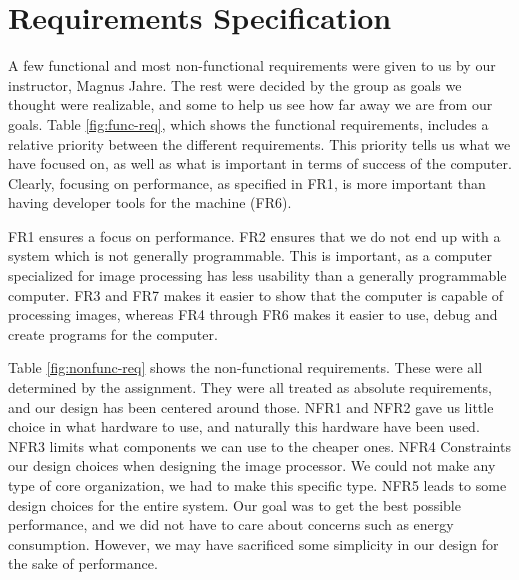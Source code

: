 \section{Requirements Specification}

 A few functional
and most non-functional requirements were given to us by our instructor, Magnus
Jahre. The rest were decided by the group as goals we thought were realizable, and
some to help us see how far away we are from our goals. Table
\ref{fig:func-req}, which shows the functional requirements, includes a relative
priority between the different requirements.  This priority tells us what we
have focused on, as well as what is important in terms of success of the
computer. Clearly, focusing on performance, as specified in {\sc FR1}, is more
important than having developer tools for the machine ({\sc FR6}).

{\sc FR1} ensures a focus on performance. {\sc FR2} ensures that we do not end
up with a system which is not generally programmable. This is important, as a
computer specialized for image processing has less usability than a generally
programmable computer. {\sc FR3} and {\sc FR7} makes it easier to show that the
computer is capable of processing images, whereas {\sc FR4} through {\sc FR6} makes it
easier to use, debug and create programs for the computer.



Table \ref{fig:nonfunc-req} shows the non-functional requirements. These were
all determined by the assignment. They were all treated as absolute requirements,
and our design has been centered around those. {\sc NFR1} and {\sc NFR2} gave us
little choice in what hardware to use, and naturally this hardware have been used. {\sc
  NFR3} limits what components we can use to the cheaper ones. {\sc NFR4} Constraints our
design choices when designing the image processor. We could not make any type of core
organization, we had to make this specific type. {\sc NFR5} leads to some
design choices for the entire system. Our goal was to get the best possible performance, and we did not
have to care about concerns such as energy consumption. 
However, we may have sacrificed some simplicity in our design for
the sake of performance.
